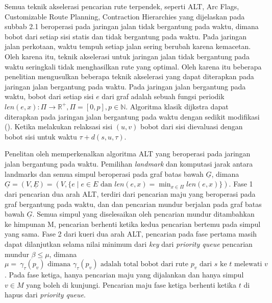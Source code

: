 Semua teknik akselerasi pencarian rute terpendek, seperti ALT, Arc Flags, Customizable Route Planning, Contraction Hierarchies yang dijelaskan pada subbab 2.1 beroperasi pada jaringan jalan tidak bergantung pada waktu, dimana bobot dari setiap sisi statis dan tidak bergantung pada waktu. Pada jaringan jalan perkotaan, waktu tempuh setiap jalan sering berubah karena kemacetan. Oleh karena itu, teknik akselerasi untuk jaringan jalan tidak bergantung pada waktu seringkali tidak menghasilkan rute yang optimal. Oleh karena itu beberapa penelitian mengusulkan beberapa teknik akselerasi yang dapat diterapkan pada jaringan jalan bergantung pada waktu. Pada jaringan jalan bergantung pada waktu, bobot dari setiap sisi $e$ dari graf adalah sebuah fungsi periodik $len(e,x): \Pi \rightarrow \mathbb{R}^{+}, \Pi=[0,p],p\in \mathbb{N}$. Algoritma klasik dijkstra dapat diterapkan pada jaringan jalan bergantung pada waktu dengan sedikit modifikasi (\cite{Cooke1966}). Ketika melakukan relaksasi sisi $(u,v)$ bobot dari sisi dievaluasi dengan bobot sisi untuk waktu $\tau + d(s,u,\tau)$. 

Penelitan oleh \cite{Nannicini2008} memperkenalkan algoritma ALT yang beroperasi pada jaringan jalan bergantung pada waktu. Pemilihan \textit{landmark} dan komputasi jarak antara landmarks dan semua simpul beroperasi pada graf batas bawah $\underline{G}$, dimana $\underline{G}=(V,\underline{E})=(V,\{e \mid e\in E \text{ dan } len(e, x)=\min_{x\in \Pi } len(e, x)  \})$. Fase 1 dari pencarian dua arah ALT, terdiri dari pencarian maju yang beroperasi pada graf bergantung pada waktu, dan dan pencarian mundur berjalan pada graf batas bawah $\underline{G}$. Semua simpul yang diselesaikan oleh pencarian mundur ditambahkan ke himpunan M, pencarian berhenti ketika kedua pencarian bertemu pada simpul yang sama. Fase 2 dari kueri dua arah ALT, pencarian pada fase pertama masih dapat dilanjutkan selama nilai minimum dari \textit{key} dari \textit{priority queue} pencarian mundur $\beta \leq \mu$, dimana $\mu=\ \gamma_{\tau}(p_v) \text{ dimana }\gamma_{\tau}(p_v) \text{ adalah total bobot dari rute } p_v \text{ dari } s \text{ ke }t \text{ melewati }v$. Pada fase ketiga, hanya pencarian maju yang dijalankan dan hanya simpul $v\in M$ yang boleh di kunjungi. Pencarian maju fase ketiga berhenti ketika $t$ di hapus dari \textit{priority queue}. 


